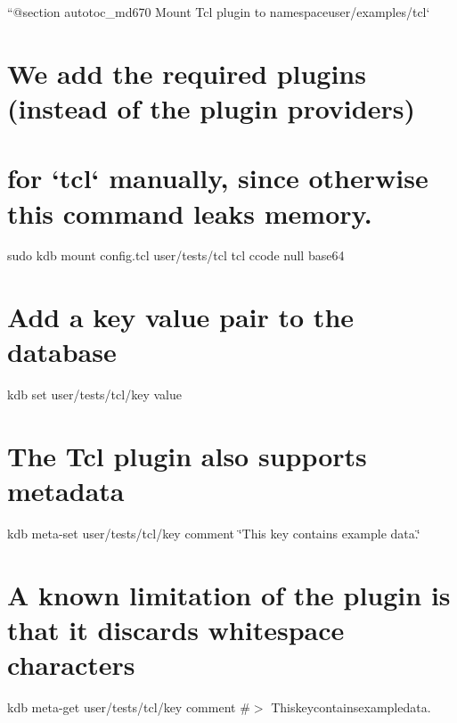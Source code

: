 ``{\ttfamily  @section autotoc\+\_\+md670 Mount Tcl plugin to namespace}user/examples/tcl` \hypertarget{autotoc_md667_autotoc_md671}{}\section{We add the required plugins (instead of the plugin providers)}\label{autotoc_md667_autotoc_md671}
\hypertarget{autotoc_md667_autotoc_md672}{}\section{for `tcl` manually, since otherwise this command leaks memory.}\label{autotoc_md667_autotoc_md672}
sudo kdb mount config.\+tcl user/tests/tcl tcl ccode null base64\hypertarget{autotoc_md667_autotoc_md673}{}\section{Add a key value pair to the database}\label{autotoc_md667_autotoc_md673}
kdb set user/tests/tcl/key value \hypertarget{autotoc_md667_autotoc_md674}{}\section{The Tcl plugin also supports metadata}\label{autotoc_md667_autotoc_md674}
kdb meta-\/set user/tests/tcl/key comment \char`\"{}\+This key contains example data.\char`\"{} \hypertarget{autotoc_md667_autotoc_md675}{}\section{A known limitation of the plugin is that it discards whitespace characters}\label{autotoc_md667_autotoc_md675}
kdb meta-\/get user/tests/tcl/key comment \#$>$ Thiskeycontainsexampledata.

